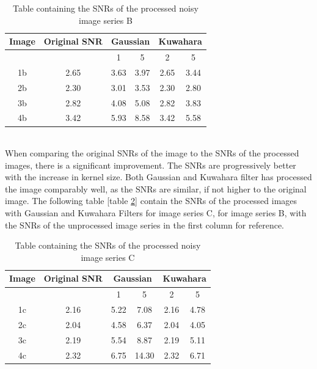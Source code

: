 \documentclass[runningheads]{llncs}
\begin{document}
\begin{table}[h!]
\setlength{\heavyrulewidth}{1.5pt}
\setlength{\abovetopsep}{4pt}
\centering
\caption{Table containing the SNRs of the processed noisy image series B}
\begin{adjustbox}{width=0.5\textwidth,center=\textwidth}
\begin{tabular}{*6c} %
\toprule
Image & Original SNR & \multicolumn{2}{c}{Gaussian} & \multicolumn{2}{c}{Kuwahara}\\
\midrule
{}   & {} & 1   & 5    & 2   & 5\\
1b   & 2.65 & 3.63 & 3.97   & 2.65  & 3.44\\
2b   & 2.30  &  3.01 & 3.53   & 2.30  & 2.80\\
3b   & 2.82  & 4.08  &  5.08   & 2.82  & 3.83\\
4b   & 3.42  & 5.93  &  8.58   & 3.42  & 5.58\\
\bottomrule
\end{tabular}
\label{tab:SNR of processed image series B}
\end{adjustbox}
\end{table}
~\\ When comparing the original SNRs of the image to the SNRs of the processed images, there is a significant improvement. The SNRs are progressively better with the increase in kernel size. Both Gaussian and Kuwahara filter has processed the image comparably well, as the SNRs are similar, if not higher to the original image.
\newpage
The following table [table \ref{tab:SNR of processed image series C}] contain the SNRs of the processed images with Gaussian and Kuwahara Filters for image series C, for image series B, with the SNRs of the unprocessed image series in the first column for reference.
\begin{table}[h!]
\setlength{\heavyrulewidth}{1.5pt}
\setlength{\abovetopsep}{4pt}
\centering
\caption{Table containing the SNRs of the processed noisy image series C}
\begin{adjustbox}{width=0.5\textwidth,center=\textwidth}
\begin{tabular}{*6c} %
\toprule
Image & Original SNR & \multicolumn{2}{c}{Gaussian} & \multicolumn{2}{c}{Kuwahara}\\
\midrule
{}   & {} & 1   & 5    & 2   & 5\\
1c   & 2.16 & 5.22 & 7.08   & 2.16  & 4.78\\
2c   & 2.04  & 4.58 & 6.37  & 2.04  & 4.05\\
3c   & 2.19 & 5.54  &  8.87   & 2.19 & 5.11\\
4c   & 2.32 & 6.75  &  14.30   & 2.32  & 6.71\\
\bottomrule
\end{tabular}
\label{tab:SNR of processed image series C}
\end{adjustbox}
\end{table}
\end{document}
